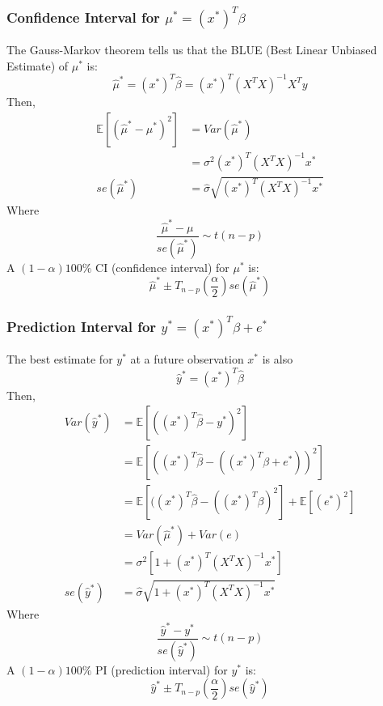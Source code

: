 \documentclass[11pt,a4paper]{article}
\begin{document}
\subsubsection{Confidence Interval for $\mu^*=(x^*)^T\beta$}
The Gauss-Markov theorem tells us that the BLUE (Best Linear Unbiased Estimate) of $\mu^*$ is:
$$\hat{\mu}^*=(x^*)^T \hat{\beta}=(x^*)^T(X^TX)^{-1}X^Ty$$
Then,
\begin{equation}
    \begin{aligned}
        \mathbb{E}[(\hat{\mu}^*-\mu^*)^2]&=Var(\hat{\mu}^*)\\
        &=\sigma^2(x^*)^T(X^TX)^{-1}x^*\\
        se(\hat{\mu}^*)&=\hat{\sigma}\sqrt{(x^*)^T(X^TX)^{-1}x^*}
    \end{aligned}
    \nonumber
\end{equation}
Where $$\frac{\hat{\mu}^*-\mu}{se(\hat{\mu}^*)} \sim t(n-p)$$
A $(1-\alpha)100\%$ CI (confidence interval) for $\mu^*$ is:
$$\hat{\mu}^*\pm T_{n-p}(\frac{\alpha}{2})se(\hat{\mu}^*)$$
\subsubsection{Prediction Interval for $y^*=(x^*)^T\beta+e^*$}
The best estimate for $y^*$ at a future observation $x^*$ is also
$$\hat{y}^*=(x^*)^T \hat{\beta}$$
Then,
\begin{equation}
    \begin{aligned}
        Var(\hat{y}^*)&=\mathbb{E}[((x^*)^T \hat{\beta}-y^*)^2]\\
        &=\mathbb{E}[((x^*)^T \hat{\beta}-((x^*)^T\beta+e^*))^2]\\
        &=\mathbb{E}[((x^*)^T \hat{\beta}-((x^*)^T\beta)^2]+\mathbb{E}[(e^*)^2]\\
        &=Var(\hat{\mu}^*)+Var(e)\\
        &=\sigma^2[1+(x^*)^T(X^TX)^{-1}x^*]\\
        se(\hat{y}^*)&=\hat{\sigma}\sqrt{1+(x^*)^T(X^TX)^{-1}x^*}
    \end{aligned}
    \nonumber
\end{equation}
Where $$\frac{\hat{y}^*-y^*}{se(\hat{y}^*)} \sim t(n-p)$$
A $(1-\alpha)100\%$ PI (prediction interval) for $y^*$ is:
$$\hat{y}^*\pm T_{n-p}(\frac{\alpha}{2})se(\hat{y}^*)$$
\end{document}
